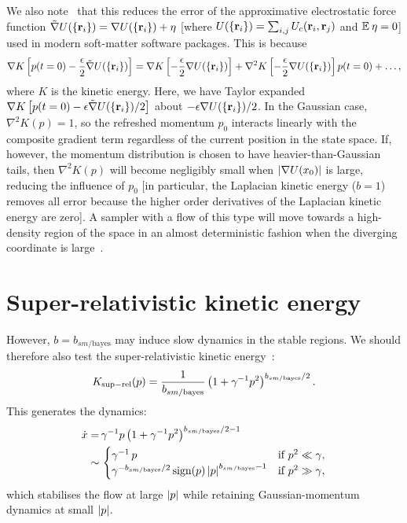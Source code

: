 \documentclass[a4paper]{article}
\begin{document}
We also note~\cite{Livingstone2019Kinetic} that this reduces the error of the approximative electrostatic force function $\tilde{\nabla} U(\{ \mathbf{r}_i \}) = \nabla U(\{ \mathbf{r}_i \}) + \eta$ [where $U(\{ \mathbf{r}_i \}) = \sum_{i, j} U_c(\mathbf{r}_i, \mathbf{r}_j)$ and $\mathbb{E}_{} \, \eta  = 0$] used in modern soft-matter software packages. This is because 
\begin{align}
\nabla K \left[ p(t = 0) - \frac{\epsilon}{2} \tilde{\nabla} U(\{ \mathbf{r}_i \}) \right] = \nabla K \left[ - \frac{\epsilon}{2} \nabla U(\{ \mathbf{r}_i \}) \right] + \nabla^2 K \left[ - \frac{\epsilon}{2} \nabla U(\{ \mathbf{r}_i \}) \right] p(t = 0) + \dots ,
\end{align}
where $K$ is the kinetic energy. Here, we have Taylor expanded $\nabla K \left[ p(t = 0) - \epsilon \tilde{\nabla} U(\{ \mathbf{r}_i \}) / 2 \right]$ about $- \epsilon \nabla U(\{ \mathbf{r}_i \}) / 2$. In the Gaussian case, $\nabla^2 K(p) = 1$, so the refreshed momentum $p_0$ interacts linearly with the composite gradient term regardless of the current position in the state space. If, however, the momentum distribution is chosen to have heavier-than-Gaussian tails, then $\nabla^2 K(p)$ will become negligibly small when $\left| \nabla U(x_0) \right|$ is large, reducing the influence of $p_0$ [in particular, the Laplacian kinetic energy ($b = 1$) removes all error because the higher order derivatives of the Laplacian kinetic energy are zero]. A sampler with a flow of this type will move towards a high-density region of the space in an almost deterministic fashion when the diverging coordinate is large~\cite{Livingstone2019Kinetic}. 


\section{Super-relativistic kinetic energy}

However, $b = b_{sm / \text{bayes}}$ may induce slow dynamics in the stable regions. We should therefore also test the super-relativistic kinetic energy~\cite{Livingstone2019Kinetic}:
\begin{align}
K_{\rm sup-rel}(p) = \frac{1}{b_{sm / \text{bayes}}} \left( 1 + \gamma^{-1} p^2 \right)^{b_{sm / \text{bayes}} / 2} .
\end{align}
This generates the dynamics:
\begin{align}
\dot{x} =& \, \gamma^{-1} p \left( 1 + \gamma^{-1} p^2 \right)^{b_{sm / \text{bayes}} / 2 - 1} \nonumber \\
\sim & \,
\begin{cases} 
\gamma^{-1} \, p &\text{if} \,\, p^2 \ll \gamma , \\
\gamma^{-b_{sm / \text{bayes}} / 2} \, \text{sign}(p) \left| p \right|^{b_{sm / \text{bayes}} - 1} &\text{if} \,\, p^2 \gg \gamma ,
\end{cases} 
\end{align}
which stabilises the flow at large $\left| p \right|$ while retaining Gaussian-momentum dynamics at small $\left| p \right|$. 
\end{document}
